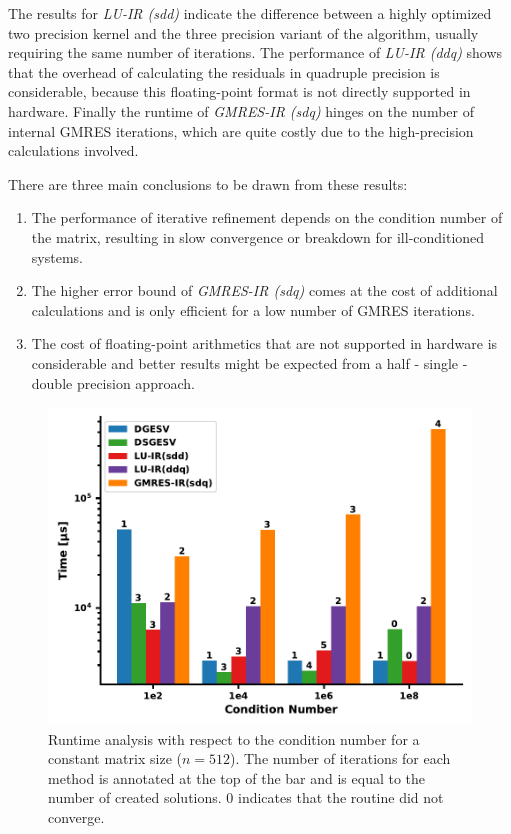 The results for \textit{LU-IR (sdd)} indicate the difference between a highly optimized two precision kernel and the three precision variant of the algorithm, usually requiring the same number of iterations. The performance of \textit{LU-IR (ddq)} shows that the overhead of calculating the residuals in quadruple precision is considerable, because this floating-point format is not directly supported in hardware. Finally the runtime of \textit{GMRES-IR (sdq)} hinges on the number of internal GMRES iterations, which are quite costly due to the high-precision calculations involved. 

There are three main conclusions to be drawn from these results:
\begin{enumerate}
    \item The performance of iterative refinement depends on the condition number of the matrix, resulting in slow convergence or breakdown for ill-conditioned systems.
    \item The higher error bound of \textit{GMRES-IR (sdq)} comes at the cost of additional calculations and is only efficient for a low number of GMRES iterations.
    \item The cost of floating-point arithmetics that are not supported in hardware is considerable and better results might be expected from a half - single - double precision approach.
\end{enumerate}

\begin{figure}[h]
    \centering
    \includegraphics[width=0.7\linewidth]{chapters/5_experiments/figures/IR3_runtime.pdf}
    \caption[IR - Runtime]{Runtime analysis with respect to the condition number for a constant matrix size ($n=512$). The number of iterations for each method is annotated at the top of the bar and is equal to the number of created solutions. $0$ indicates that the routine did not converge.}
    \label{fig:ir3_time}
\end{figure}

